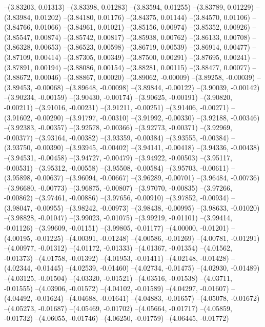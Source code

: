 --(3.83203, 0.01313)
--(3.83398, 0.01283)
--(3.83594, 0.01255)
--(3.83789, 0.01229)
--(3.83984, 0.01202)
--(3.84180, 0.01176)
--(3.84375, 0.01144)
--(3.84570, 0.01106)
--(3.84766, 0.01066)
--(3.84961, 0.01021)
--(3.85156, 0.00974)
--(3.85352, 0.00926)
--(3.85547, 0.00874)
--(3.85742, 0.00817)
--(3.85938, 0.00762)
--(3.86133, 0.00708)
--(3.86328, 0.00653)
--(3.86523, 0.00598)
--(3.86719, 0.00539)
--(3.86914, 0.00477)
--(3.87109, 0.00414)
--(3.87305, 0.00349)
--(3.87500, 0.00291)
--(3.87695, 0.00241)
--(3.87891, 0.00194)
--(3.88086, 0.00154)
--(3.88281, 0.00115)
--(3.88477, 0.00077)
--(3.88672, 0.00046)
--(3.88867, 0.00020)
--(3.89062, -0.00009)
--(3.89258, -0.00039)
--(3.89453, -0.00068)
--(3.89648, -0.00098)
--(3.89844, -0.00122)
--(3.90039, -0.00142)
--(3.90234, -0.00159)
--(3.90430, -0.00174)
--(3.90625, -0.00191)
--(3.90820, -0.00211)
--(3.91016, -0.00231)
--(3.91211, -0.00251)
--(3.91406, -0.00271)
--(3.91602, -0.00290)
--(3.91797, -0.00310)
--(3.91992, -0.00330)
--(3.92188, -0.00346)
--(3.92383, -0.00357)
--(3.92578, -0.00366)
--(3.92773, -0.00371)
--(3.92969, -0.00377)
--(3.93164, -0.00382)
--(3.93359, -0.00384)
--(3.93555, -0.00384)
--(3.93750, -0.00390)
--(3.93945, -0.00402)
--(3.94141, -0.00418)
--(3.94336, -0.00438)
--(3.94531, -0.00458)
--(3.94727, -0.00479)
--(3.94922, -0.00503)
--(3.95117, -0.00531)
--(3.95312, -0.00558)
--(3.95508, -0.00584)
--(3.95703, -0.00611)
--(3.95898, -0.00637)
--(3.96094, -0.00667)
--(3.96289, -0.00701)
--(3.96484, -0.00736)
--(3.96680, -0.00773)
--(3.96875, -0.00807)
--(3.97070, -0.00835)
--(3.97266, -0.00862)
--(3.97461, -0.00886)
--(3.97656, -0.00910)
--(3.97852, -0.00934)
--(3.98047, -0.00955)
--(3.98242, -0.00973)
--(3.98438, -0.00995)
--(3.98633, -0.01020)
--(3.98828, -0.01047)
--(3.99023, -0.01075)
--(3.99219, -0.01101)
--(3.99414, -0.01126)
--(3.99609, -0.01151)
--(3.99805, -0.01177)
--(4.00000, -0.01201)
--(4.00195, -0.01225)
--(4.00391, -0.01248)
--(4.00586, -0.01269)
--(4.00781, -0.01291)
--(4.00977, -0.01312)
--(4.01172, -0.01333)
--(4.01367, -0.01354)
--(4.01562, -0.01373)
--(4.01758, -0.01392)
--(4.01953, -0.01411)
--(4.02148, -0.01428)
--(4.02344, -0.01445)
--(4.02539, -0.01460)
--(4.02734, -0.01475)
--(4.02930, -0.01489)
--(4.03125, -0.01504)
--(4.03320, -0.01521)
--(4.03516, -0.01538)
--(4.03711, -0.01555)
--(4.03906, -0.01572)
--(4.04102, -0.01589)
--(4.04297, -0.01607)
--(4.04492, -0.01624)
--(4.04688, -0.01641)
--(4.04883, -0.01657)
--(4.05078, -0.01672)
--(4.05273, -0.01687)
--(4.05469, -0.01702)
--(4.05664, -0.01717)
--(4.05859, -0.01732)
--(4.06055, -0.01746)
--(4.06250, -0.01759)
--(4.06445, -0.01772)
